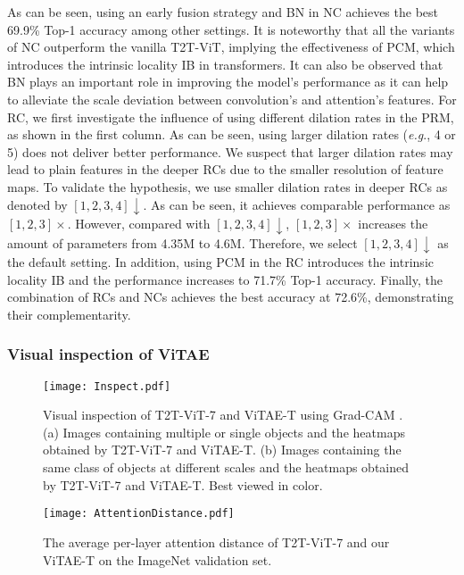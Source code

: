 \documentclass[twocolumn]{svjour3}          \smartqed  \usepackage{natbib}
\newcommand{\eg}{e.g}
\def\onedot{.\xspace}
\def\eg{\emph{e.g}\onedot}
\begin{document}
\begin{table}
\end{table}As can be seen, using an early fusion strategy and BN in NC achieves the best 69.9\% Top-1 accuracy among other settings. It is noteworthy that all the variants of NC outperform the vanilla T2T-ViT, implying the effectiveness of PCM, which introduces the intrinsic locality IB in transformers. It can also be observed that BN plays an important role in improving the model's performance as it can help to alleviate the scale deviation between convolution's and attention's features. For RC, we first investigate the influence of using different dilation rates in the PRM, as shown in the first column. As can be seen, using larger dilation rates (\eg, 4 or 5) does not deliver better performance. We suspect that larger dilation rates may lead to plain features in the deeper RCs due to the smaller resolution of feature maps. To validate the hypothesis, we use smaller dilation rates in deeper RCs as denoted by $[1, 2, 3, 4]\downarrow$. As can be seen, it achieves comparable performance as $[1, 2, 3]\times$. However, compared with $[1, 2, 3, 4]\downarrow$, $[1, 2, 3]\times$ increases the amount of parameters from 4.35M to 4.6M. Therefore, we select $[1, 2, 3, 4]\downarrow$ as the default setting. In addition, using PCM in the RC introduces the intrinsic locality IB and the performance increases to 71.7\% Top-1 accuracy. Finally, the combination of RCs and NCs achieves the best accuracy at 72.6\%, demonstrating their complementarity.

\subsubsection{Visual inspection of ViTAE}

\begin{figure*}
    \centering
    \texttt{[image: Inspect.pdf]}
    \caption{Visual inspection of T2T-ViT-7 and ViTAE-T using Grad-CAM \citep{selvaraju2017grad}. (a) Images containing multiple or single objects and the heatmaps obtained by T2T-ViT-7 and ViTAE-T. (b) Images containing the same class of objects at different scales and the heatmaps obtained by T2T-ViT-7 and ViTAE-T. Best viewed in color.}
    \label{fig:visualInspect}
\end{figure*}


\begin{figure}
    \texttt{[image: AttentionDistance.pdf]}
    \caption{The average per-layer attention distance of T2T-ViT-7 and our ViTAE-T on the ImageNet validation set.}
    \label{fig:attentionDistance}
\end{figure}
\end{document}

